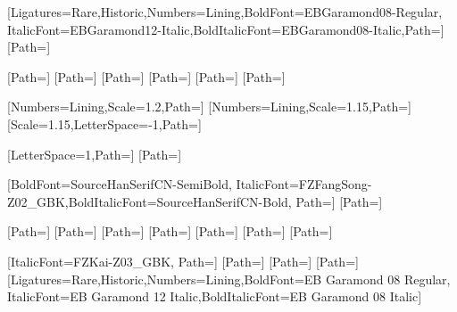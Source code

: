 \ifdefined\freefont
    \usepackage{fontspec}
    \usepackage[fontset=none]{ctex}
    \ifdefined\fontpath
        \setmainfont{EBGaramond12-Regular}[Ligatures={Rare,Historic},Numbers=Lining,BoldFont=EBGaramond08-Regular, ItalicFont=EBGaramond12-Italic,BoldItalicFont=EBGaramond08-Italic,Path=\fontpath]
        \setmonofont{FiraCode-Regular}[Path=\fontpath]

        \newfontfamily{}[Path=\fontpath]
        \newfontfamily{}[Path=\fontpath]
        \newfontfamily{}[Path=\fontpath]
        \newfontfamily{}[Path=\fontpath]
        \newfontfamily{}[Path=\fontpath]
        \newfontfamily{}[Path=\fontpath]

        \newfontfamily{}[Numbers=Lining,Scale=1.2,Path=\fontpath]
        \newfontfamily{}[Numbers=Lining,Scale=1.15,Path=\fontpath]
        \newfontfamily{}[Scale=1.15,LetterSpace=-1,Path=\fontpath]

        \newfontfamily{}[LetterSpace=1,Path=\fontpath]
        \newfontfamily{}[Path=\fontpath]

        [BoldFont=SourceHanSerifCN-SemiBold, ItalicFont=FZFangSong-Z02_GBK,BoldItalicFont=SourceHanSerifCN-Bold, Path=\fontpath]
        [Path=\fontpath]

        \newCJKfontfamily{}[Path=\fontpath]
        \newCJKfontfamily{}[Path=\fontpath]
        \newCJKfontfamily{}[Path=\fontpath]
        \newCJKfontfamily{}[Path=\fontpath]
        \newCJKfontfamily{}[Path=\fontpath]
        \newCJKfontfamily{}[Path=\fontpath]
        \newCJKfontfamily{}[Path=\fontpath]

        \newCJKfontfamily{}[ItalicFont=FZKai-Z03_GBK, Path=\fontpath] %
        \newCJKfontfamily{}[Path=\fontpath] %
        \newCJKfontfamily{}[Path=\fontpath] %
        \newCJKfontfamily{}[Path=\fontpath] %
    \else
        \setmainfont{EB Garamond 12 Regular}[Ligatures={Rare,Historic},Numbers=Lining,BoldFont=EB Garamond 08 Regular, ItalicFont=EB Garamond 12 Italic,BoldItalicFont=EB Garamond 08 Italic]
        \setmonofont{Fira Code Regular}

